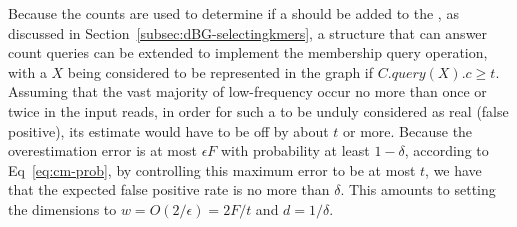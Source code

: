 Because the \kmer counts are used to determine if a \kmer should be added to the \dBG, as discussed in Section~\ref{subsec:dBG-selectingkmers}, a structure that can answer count queries can be extended to implement the membership query operation, with a \kmer $X$ being considered to be represented in the graph if $C.\mathit{query}(X).c \geq t$. 
Assuming that the vast majority of low-frequency \kmers occur no more than once or twice in the input reads, in order for such a \kmer to be unduly considered as real (false positive), its \cm estimate would have to be off by about $t$ or more. Because the \cm overestimation error is at most $\epsilon F$ with probability at least $1-\delta$, according to Eq~\ref{eq:cm-prob}, by controlling this maximum error to be at most $t$, we have that the expected false positive rate is no more than $\delta$. This amounts to setting the \cm dimensions to $w=O(2/\epsilon) = 2F/t$ and $d=1/\delta$.






